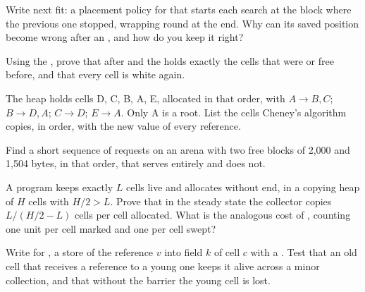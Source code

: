 \begin{exercise}[$\star\star$]\label{exo:b3:garbage-collection:6}
Write next fit: a placement policy for  that starts each search at the block where the previous one stopped, wrapping round at the end. Why can its saved position become wrong after an , and how do you keep it right?
\end{exercise}

\begin{exercise}[$\star\star$]\label{exo:b3:garbage-collection:7}
Using the , prove that after  and  the  holds exactly the cells that were  or free before, and that every cell is white again.
\end{exercise}

\begin{exercise}[$\star\star$]\label{exo:b3:garbage-collection:8}
The heap holds cells D, C, B, A, E, allocated in that order, with $A \to B, C$; $B \to D, A$; $C \to D$; $E \to A$. Only A is a root. List the cells Cheney's algorithm copies, in order, with the new value of every reference.
\end{exercise}

\begin{exercise}[$\star\star$]\label{exo:b3:garbage-collection:9}
Find a short sequence of requests on an arena with two free blocks of 2,000 and 1,504 bytes, in that order, that  serves entirely and  does not.
\end{exercise}

\begin{exercise}[$\star\star\star$]\label{exo:b3:garbage-collection:10}
A program keeps exactly $L$ cells live and allocates without end, in a copying heap of $H$ cells with $H/2 > L$. Prove that in the steady state the collector copies $L/(H/2 - L)$ cells per cell allocated. What is the analogous cost of , counting one unit per cell marked and one per cell swept?
\end{exercise}

\begin{exercise}[$\star\star\star$]\label{exo:b3:garbage-collection:11}
Write  for , a store of the reference $v$ into field $k$ of cell $c$ with a . Test that an old cell that receives a reference to a young one keeps it alive across a minor collection, and that without the barrier the young cell is lost.
\end{exercise}

